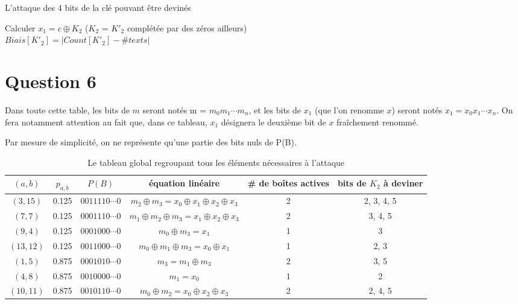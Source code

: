 \begin{algorithm}
\caption{L'attaque des 4 bits de la clé pouvant être devinés}
	{
		{
			{
				Calculer $x_1 = c \oplus K_2$ ($K_2$ = $K'_2$ complétée par des zéros ailleurs) \\
			}
		$Biais[K'_2] = | Count[K'_2] - \# texts |$
		}
		
	}
\end{algorithm}

\section*{Question 6}

Dans toute cette table, les bits de $m$ seront notés m = $m_0 m_1\cdots m_n$, et les bits de $x_1$ (que l'on renomme $x$) seront notés $x_1 = x_0 x_1 \cdots x_n$. On fera notamment attention au fait que, dans ce tableau, $x_1$ désignera le deuxième bit de $x$ fraîchement renommé.

Par mesure de simplicité, on ne représente qu'une partie des bits nuls de P(B).

\begin{table}[!ht]
\centering
\begin{small}
\begin{tabular}{|c|c|c|c|c|c|}
	\hline
	$(a,b)$   & $p_{a,b}$ & 		$P(B)$ 	   & équation linéaire	 & \# de boîtes actives & bits de $K_2$ à deviner \\
	\hline
	$(3,15)$  &   0.125   & $0011110\cdots0$ & $m_2 \oplus m_3 = x_0 \oplus x_1 \oplus x_2 \oplus x_3$ & 2 & 2, 3, 4, 5 \\
	\hline
	$(7,7)$   &   0.125   & $0001110\cdots0$ & $m_1 \oplus m_2 \oplus m_3 = x_1 \oplus x_2 \oplus x_3$ & 2 & 3, 4, 5\\
	\hline
	$(9,4)$   &   0.125   & $0001000\cdots0$ & $m_0 \oplus m_3 = x_1$ 								   & 1 & 3 \\
	\hline
	$(13,12)$ &   0.125   & $0011000\cdots0$ & $m_0 \oplus m_1 \oplus m_3 = x_0 \oplus x_1$ 		   & 1 & 2, 3 \\
	\hline
	$(1,5)$   &   0.875   & $0001010\cdots0$ & $m_3 = m_1 \oplus m_3$								   & 2 & 3, 5 \\
	\hline
	$(4,8)$   &   0.875   & $0010000\cdots0$ & $m_1 = x_0$ 											   & 1 & 2 \\
	\hline
	$(10,11)$ &   0.875   & $0010110\cdots0$ & $m_0 \oplus m_2 = x_0 \oplus x_2 \oplus x_3$			   & 2 & 2, 4, 5 \\
	\hline
\end{tabular}
\end{small}
\caption{Le tableau global regroupant tous les éléments nécessaires à l'attaque}
\end{table}

